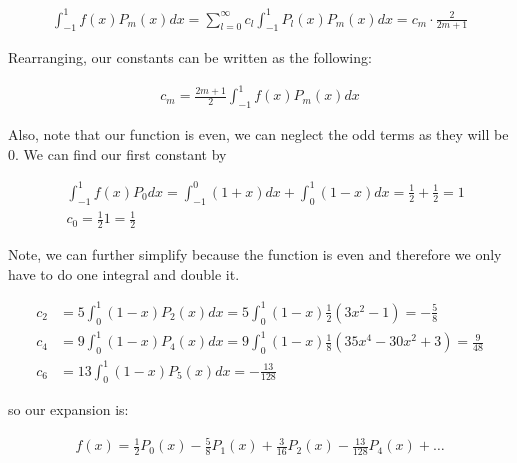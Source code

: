 \documentclass{article}
\numberwithin{equation}{section}
\begin{document}
\begin{align}
    \int_{-1}^{1} f(x) P_m(x)dx = \sum_{l=0}^{\infty} c_l \int_{-1}^{1} P_l(x) P_m(x) dx = c_m \cdot \frac{2}{2m+1 }
\end{align}


Rearranging, our constants can be written as the following:

\begin{align}
    c_m = \frac{2m+1}{2} \int_{-1}^{1} f(x) P_m(x)dx
\end{align}

Also, note that our function is even, we can neglect the odd terms as they will be 0. We can find our first constant by

\begin{align}
    &\int_{-1}^{1} f(x) P_0 dx = \int_{-1}^{0} (1+x)dx + \int_{0}^{1} (1-x) dx = \frac{1}{2} + \frac{1}{2} =1\\
    &c_0 = \frac{1}{2} 1 = \frac{1}{2}
\end{align}

Note, we can further simplify because the function is even and therefore we only have to do one integral and double it.

\begin{align}
    c_2 &= 5 \int_{0}^{1} (1-x) P_2(x) dx = 5 \int_{0}^{1} (1-x) \frac{1}{2}(3x^2-1) = -\frac{5}{8} \\
    c_4 &= 9 \int_{0}^{1} (1-x) P_4(x) dx = 9 \int_{0}^{1} (1-x) \frac{1}{8} (35x^4 - 30x^2 + 3) = \frac{9}{48} \\
    c_6 &= 13 \int_{0}^{1} (1-x) P_5(x) dx = - \frac{13}{128}
\end{align}

so our expansion is:

\begin{align}
    f(x) = \frac{1}{2}P_0(x) - \frac{5}{8} P_1(x) + \frac{3}{16} P_2(x) - \frac{13}{128} P_4(x) + \ldots
\end{align}
\end{document}
